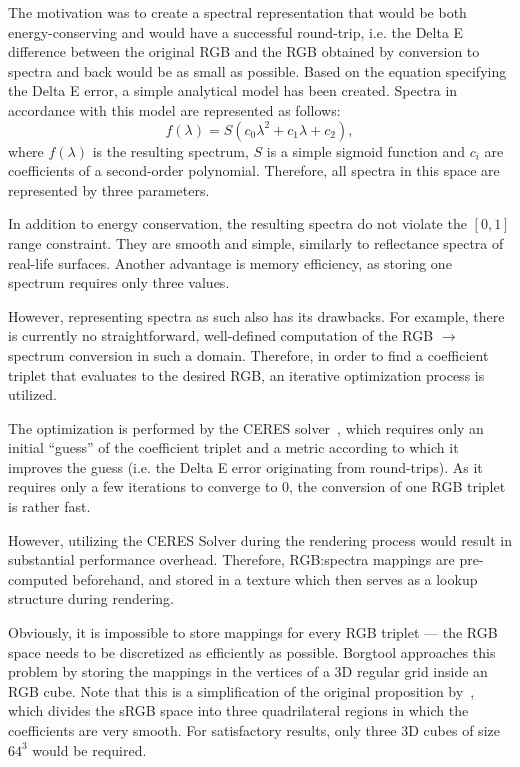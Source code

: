 The motivation was to create a spectral representation that would be both energy-conserving and would have a successful round-trip, i.e. the Delta E difference between the original RGB and the RGB obtained by conversion to spectra and back would be as small as possible. Based on the equation specifying the Delta E error, a simple analytical model has been created. Spectra in accordance with this model are represented as follows:
\begin{equation} \label{sigmoidRepresentation}
f(\lambda)=S(c_{0}\lambda^2+c_{1}\lambda+c_{2}),
\end{equation}
where $f(\lambda)$ is the resulting spectrum, $S$ is a simple sigmoid function and $c_{i}$ are coefficients of a second-order polynomial. Therefore, all spectra in this space are represented by three parameters.

In addition to energy conservation, the resulting spectra do not violate the $[0,1]$ range constraint. They are smooth and simple, similarly to reflectance spectra of real-life surfaces. Another advantage is memory efficiency, as storing one spectrum requires only three values.

However, representing spectra as such also has its drawbacks. For example, there is currently no straightforward, well-defined computation of the RGB $\to$ spectrum conversion in such a domain. Therefore, in order to find a coefficient triplet that evaluates to the desired RGB, an iterative optimization process is utilized.

The optimization is performed by the CERES solver~\cite{ceres-solver}, which requires only an initial ``guess'' of the coefficient triplet and a metric according to which it improves the guess (i.e. the Delta E error originating from round-trips). As it requires only a few iterations to converge to 0, the conversion of one RGB triplet is rather fast.

However, utilizing the CERES Solver during the rendering process would result in substantial performance overhead. Therefore, RGB:spectra mappings are pre-computed beforehand, and stored in a texture which then serves as a lookup structure during rendering.

Obviously, it is impossible to store mappings for every RGB triplet --- the RGB space needs to be discretized as efficiently as possible. Borgtool approaches this problem by storing the mappings in the vertices of a 3D regular grid inside an RGB cube. Note that this is a simplification of the original proposition by~\citet{upsamplingJakobHanika}, which divides the sRGB space into three quadrilateral regions in which the coefficients are very smooth. For satisfactory results, only three 3D cubes of size $64^3$ would be required.

